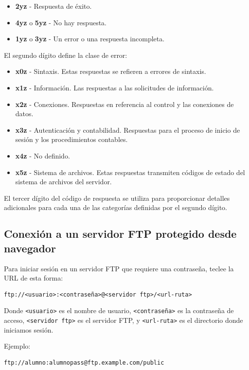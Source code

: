 \documentclass[a4paper, 12pt]{article}
\begin{document}
\begin{itemize}
    \item \textbf{2yz} - Respuesta de éxito.
    \item \textbf{4yz} o \textbf{5yz} - No hay respuesta.
    \item \textbf{1yz} o \textbf{3yz} - Un error o una respuesta incompleta.
\end{itemize}

El segundo dígito define la clase de error:

\begin{itemize}
    \item \textbf{x0z} - Sintaxis. Estas respuestas se refieren a errores de sintaxis.
    \item \textbf{x1z} - Información. Las respuestas a las solicitudes de información.
    \item \textbf{x2z} - Conexiones. Respuestas en referencia al control y las conexiones de datos.
    \item \textbf{x3z} - Autenticación y contabilidad. Respuestas para el proceso de inicio de sesión y los procedimientos contables.
    \item \textbf{x4z} - No definido.
    \item \textbf{x5z} - Sistema de archivos. Estas respuestas transmiten códigos de estado del sistema de archivos del servidor.
\end{itemize}

El tercer dígito del código de respuesta se utiliza para proporcionar detalles adicionales para cada una de las categorías definidas por el segundo dígito.



\subsection{Conexión a un servidor FTP protegido desde navegador}
Para iniciar sesión en un servidor FTP que requiere una contraseña, teclee la URL de esta forma:

\begin{verbatim}
ftp://<usuario>:<contraseña>@<servidor ftp>/<url-ruta>
\end{verbatim}

Donde \texttt{<usuario>} es el nombre de usuario, \texttt{<contraseña>} es la contraseña de acceso, \texttt{<servidor ftp>} es el servidor FTP, y \texttt{<url-ruta>} es el directorio donde iniciamos sesión.

Ejemplo:
\begin{verbatim}
ftp://alumno:alumnopass@ftp.example.com/public
\end{verbatim}
\end{document}
